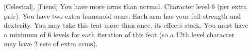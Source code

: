  {[Celestial], [Fiend]}
\descfeat
{You have more arms than normal.}
{Character level 6 (per extra pair).}
{You have two extra humanoid arms. Each arm has your full strength and dexterity.}
{You may take this feat more than once, its effects stack. You must have a minimum of 6 levels for each iteration of this feat (so a 12th level character may have 2 sets of extra arms).}